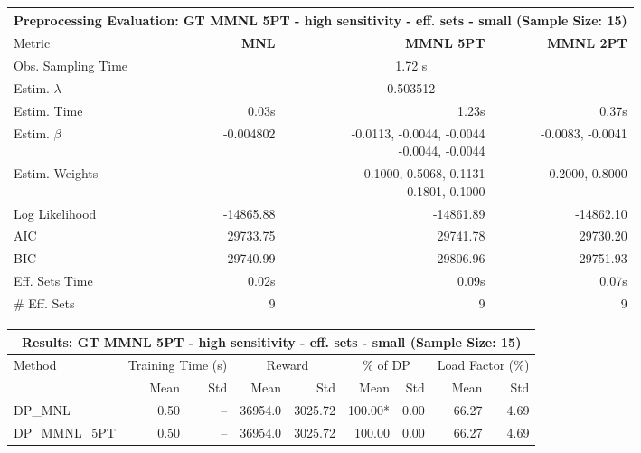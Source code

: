 
\begin{samepage}
\begin{center}
  \small
  \begin{tabular}{l|r|r|r}
    \toprule
    \multicolumn{4}{c}{\textbf{Preprocessing Evaluation: GT MMNL 5PT - high sensitivity - eff. sets - small (Sample Size: 15)}} \\
    \midrule
    Metric & \textbf{MNL} & \textbf{MMNL 5PT} & \textbf{MMNL 2PT} \\
    \midrule
    Obs. Sampling Time & \multicolumn{3}{c}{1.72 s} \\
    Estim. $\lambda$ & \multicolumn{3}{c}{0.503512} \\
    Estim. Time & 0.03s & 1.23s & 0.37s \\
    Estim. $\beta$ & -0.004802 & \makecell[tr]{-0.0113, -0.0044, -0.0044 \\ -0.0044, -0.0044} & -0.0083, -0.0041 \\
    Estim. Weights & - & \makecell[tr]{0.1000, 0.5068, 0.1131 \\ 0.1801, 0.1000} & 0.2000, 0.8000 \\
    Log Likelihood & -14865.88 & -14861.89 & -14862.10 \\
    AIC & 29733.75 & 29741.78 & 29730.20 \\
    BIC & 29740.99 & 29806.96 & 29751.93 \\
    Eff. Sets Time & 0.02s & 0.09s & 0.07s \\
    \# Eff. Sets & 9 & 9 & 9 \\
    \bottomrule
  \end{tabular}
\end{center}
\begin{center}
  \small
  \begin{tabular}{l|rr|rr|rr|rr}
    \toprule
    \multicolumn{9}{c}{\textbf{Results: GT MMNL 5PT - high sensitivity - eff. sets - small (Sample Size: 15)}} \\
    \midrule
    Method & \multicolumn{2}{c|}{Training Time (s)} & \multicolumn{2}{c|}{Reward} & \multicolumn{2}{c|}{\% of DP} & \multicolumn{2}{c}{Load Factor (\%)} \\
    & Mean & Std & Mean & Std & Mean & Std & Mean & Std \\
    \midrule
    DP\_MNL      &     0.50 &    -- &    36954.0 &    3025.72 & 100.00* &    0.00 &   66.27 &    4.69 \\
    DP\_MMNL\_5PT &     0.50 &    -- &    36954.0 &    3025.72 &  100.00 &    0.00 &   66.27 &    4.69 \\

\end{tabular}
\end{center}
\end{samepage}
